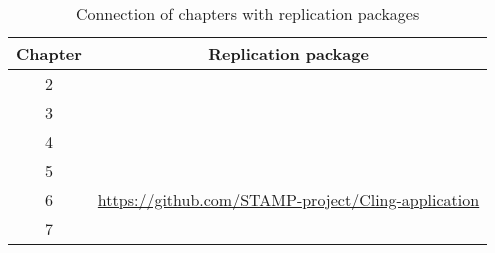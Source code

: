 \begin{table}[!t]
    \begin{center}
        
    
    \caption{Connection of chapters with replication packages}
    \label{tab:replicationpackages}
    \begin{tabular}{|c||c|}
    \textbf{Chapter} & \textbf{Replication package}\\
    \hline
    \hline
    2 & \cite{zenodoJCrashPack} \\
    3 & \cite{pouria_derakhshanfar_2019_3673916} \\
    4 & \cite{zenodoRP} \\
    5 & \cite{derakhshanfar_pouria_2020_3953519} \\
    6 & \url{https://github.com/STAMP-project/Cling-application} \\
    7 & \cite{evers_bjorn_2020_3894711} \\
    \hline
    \end{tabular}
\end{center}
    \end{table}












